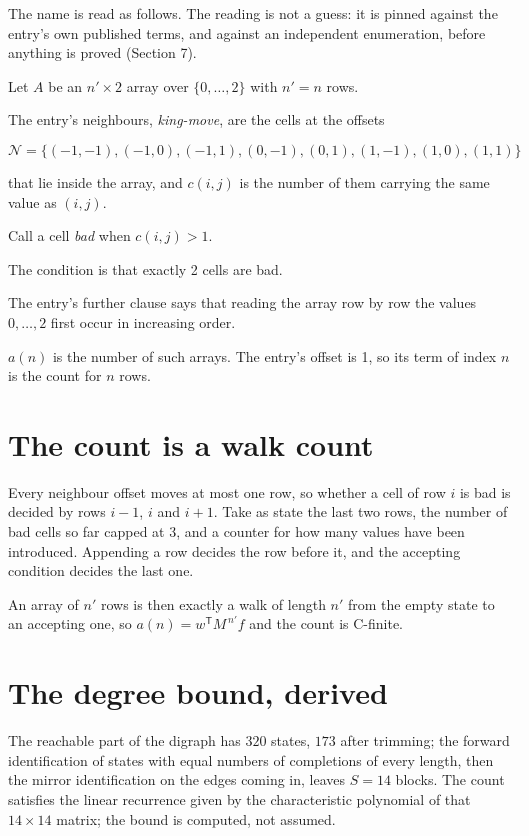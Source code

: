 \documentclass[11pt]{article}
\theoremstyle{definition}
\begin{document}
The name is read as follows. The reading is not a guess: it is pinned against the entry's own published terms, and against an independent enumeration, before anything is proved (Section 7).

Let $A$ be an $n' \times 2$ array over $\{0,\dots,2\}$ with $n' = n$ rows.

The entry's neighbours, {\itshape king-move}, are the cells at the offsets

\[\mathcal{N} = \{(-1,-1), (-1,0), (-1,1), (0,-1), (0,1), (1,-1), (1,0), (1,1)\}\]

that lie inside the array, and $c(i,j)$ is the number of them carrying the same value as $(i,j)$.

Call a cell {\itshape bad} when $c(i,j) > 1$.

The condition is that exactly 2 cells are bad.

The entry's further clause says that reading the array row by row the values $0,\dots,2$ first occur in increasing order.

$a(n)$ is the number of such arrays. The entry's offset is 1, so its term of index $n$ is the count for $n$ rows.

\section{The count is a walk count}

Every neighbour offset moves at most one row, so whether a cell of row $i$ is bad is decided by rows $i-1$, $i$ and $i+1$. Take as state the last two rows, the number of bad cells so far capped at 3, and a counter for how many values have been introduced. Appending a row decides the row before it, and the accepting condition decides the last one.

An array of $n'$ rows is then exactly a walk of length $n'$ from the empty state to an accepting one, so $a(n) = w^{\mathsf T}M^{\,n'}f$ and the count is C-finite.

\section{The degree bound, derived}

The reachable part of the digraph has $320$ states, $173$ after trimming; the forward identification of states with equal numbers of completions of every length, then the mirror identification on the edges coming in, leaves $S = 14$ blocks. The count satisfies the linear recurrence given by the characteristic polynomial of that $14\times14$ matrix; the bound is computed, not assumed.
\end{document}
